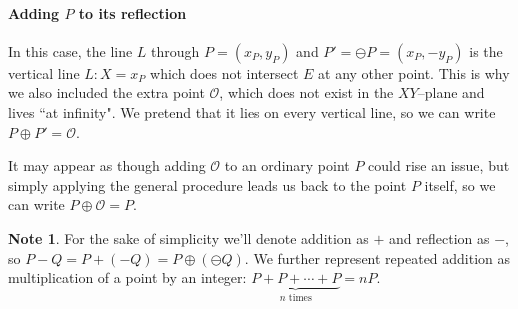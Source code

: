 \documentclass[9pt]{article}
\theoremstyle{definition}
\newtheorem*{note}{Note}
\begin{document}
\paragraph{Adding $P$ to its reflection}
In this case, the line $L$ through $P = (x_P, y_P)$ and $P' = \ominus P = (x_P, -y_P)$ is the vertical line $L: X = x_P$ which does not intersect $E$ at any other point. This is why we also included the extra point $\mathcal{O}$, which does not exist in the $XY$--plane and lives ``at infinity". We pretend that it lies on every vertical line, so we can write $P \oplus P' = \mathcal{O}$.

It may appear as though adding $\mathcal{O}$ to an ordinary point $P$ could rise an issue, but simply applying the general procedure leads us back to the point $P$ itself, so we can write $P \oplus \mathcal{O} = P$.

\begin{note}
For the sake of simplicity we'll denote addition as $+$ and reflection as $-$, so $P - Q = P + (-Q) = P \oplus (\ominus Q)$. We further represent repeated addition as multiplication of a point by an integer: $\underbrace{P + P + \cdots + P}_{n\text{ times}} = nP.$
\end{note}
\end{document}
